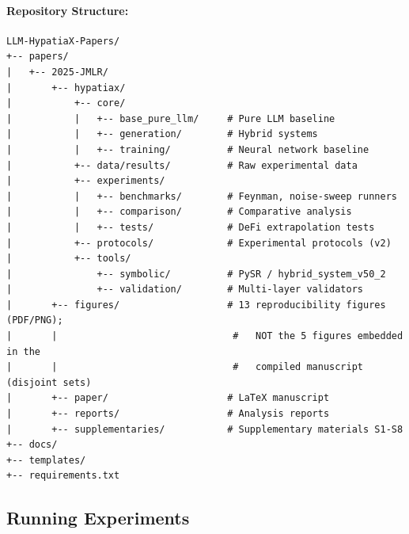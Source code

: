 \documentclass[twoside,11pt]{article}
\begin{document}
\paragraph{Repository Structure:}
\begin{small}
\begin{verbatim}
LLM-HypatiaX-Papers/
+-- papers/
|   +-- 2025-JMLR/
|       +-- hypatiax/
|           +-- core/
|           |   +-- base_pure_llm/     # Pure LLM baseline
|           |   +-- generation/        # Hybrid systems
|           |   +-- training/          # Neural network baseline
|           +-- data/results/          # Raw experimental data
|           +-- experiments/
|           |   +-- benchmarks/        # Feynman, noise-sweep runners
|           |   +-- comparison/        # Comparative analysis
|           |   +-- tests/             # DeFi extrapolation tests
|           +-- protocols/             # Experimental protocols (v2)
|           +-- tools/
|               +-- symbolic/          # PySR / hybrid_system_v50_2
|               +-- validation/        # Multi-layer validators
|       +-- figures/                   # 13 reproducibility figures (PDF/PNG);
|       |                               #   NOT the 5 figures embedded in the
|       |                               #   compiled manuscript (disjoint sets)
|       +-- paper/                     # LaTeX manuscript
|       +-- reports/                   # Analysis reports
|       +-- supplementaries/           # Supplementary materials S1-S8
+-- docs/
+-- templates/
+-- requirements.txt
\end{verbatim}
\end{small}

\subsection{Running Experiments}
\end{document}
